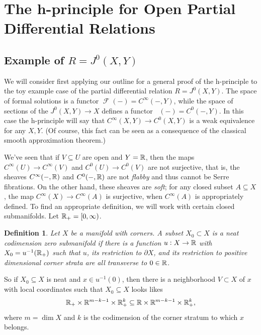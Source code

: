\documentclass{article}
\newtheorem{definition}[theorem]{Definition}
\newtheorem{proposed work}[theorem]{Proposed Work}
\theoremstyle{definition}
\DeclareMathOperator{\CF}{\mathcal F}
\DeclareMathOperator{\CFh}{\mathcal{F}^{h}} %
\begin{document}
%
%

\section{The h-principle for Open Partial Differential Relations}


\subsection{Example of $R = J^0(X,Y)$}

We will consider first applying our outline for a general proof of the
h-principle to the toy example case of the partial differential
relation $R = J^0(X,Y)$. The space of formal solutions is a functor
$\CF(-) = C^\infty(- , Y)$, while the space of sections of the
$J^0(X,Y)\to X$ defines a functor $\CFh(-) = C^0(-,Y)$. In this case
the h-principle will say that $C^\infty(X,Y) \to C^0(X,Y)$ is a
weak equivalence for any $X,Y$. %
(Of course, this fact can be seen as a consequence of the classical smooth
approximation theorem.)

We've seen that if $V\subseteq U$ are open and $Y=\mathbb R$, then the maps
$C^\infty(U)\to C^\infty(V)$ and $C^0(U)\to C^0(V)$ are not
surjective, that is, the sheaves $C^\infty(-,\mathbb R)$ and $C^0(-, \mathbb R)$ are
not {\em flabby} and thus cannot be Serre fibrations. On the other
hand, these sheaves are {\em soft}; for any closed subset
$A\subseteq X$, the map $C^\infty(X) \to C^\infty(A)$ is surjective,
when $C^\infty(A)$ is appropriately defined. To find an appropriate
definition, we will work with certain closed submanifolds. Let $\mathbb R_+ =
[0,\infty)$. 

\begin{definition} \label{def:neat} Let $X$ be a manifold with
  corners. A subset $X_0\subset X$ is a {\em neat codimension zero
    submanifold} if there is a function $u: X\to \mathbb R$ with
  $X_0 = u^{-1}(\mathbb R_+)$ such that $u$, its restriction to $\partial X$,
  and its restriction to positive dimensional corner strata are all
  transverse to $0\in \mathbb R$.
\end{definition}

So if $X_0\subseteq X$ is neat and $x\in u^{-1}(0)$, then there is a
neighborhood $V\subset X$ of $x$ with local coordinates such that
$X_0 \subseteq X$ looks likes
\[\mathbb R_+ \times \mathbb R^{m-k-1}\times \mathbb R_+^k \subseteq \mathbb R\times
  \mathbb R^{m-k-1}\times \mathbb R_+^k,\] where $m = \dim X$ and $k$ is the
codimension of the corner stratum to which $x$ belongs.
\end{document}
